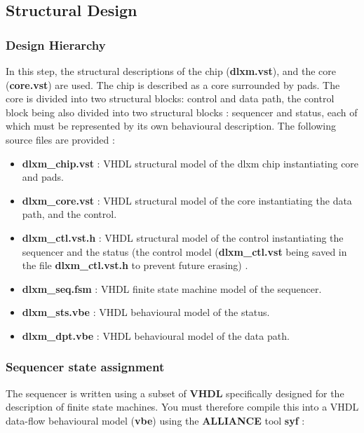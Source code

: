 

	\subsection{Structural Design}

    		\subsubsection{Design Hierarchy}


In this step, the structural descriptions of the chip ({\bf dlxm.vst}), and the core ({\bf core.vst}) are used.
The chip is described as a core surrounded by pads.
 The core is divided into two structural blocks: control and data
 path, the control block being also divided into two structural blocks
 : sequencer and status, each of which must be represented by its own behavioural description. The following source files are provided :

\begin {itemize}
\item
{\bf dlxm\_chip.vst} : VHDL structural model of the dlxm chip instantiating core and pads.
\item
{\bf dlxm\_core.vst} : VHDL structural model of the core instantiating the data path,
and the control.
\item
{\bf dlxm\_ctl.vst.h} : VHDL structural model of the control instantiating the 
sequencer and the status (the control model ({\bf dlxm\_ctl.vst} being saved in the file
{\bf dlxm\_ctl.vst.h} to prevent future erasing) .
\item {\bf dlxm\_seq.fsm} : VHDL finite state machine model of the sequencer.
\item {\bf dlxm\_sts.vbe} : VHDL behavioural model of the status.
\item {\bf dlxm\_dpt.vbe} : VHDL behavioural model of the data path.
\end{itemize}

    		\subsubsection{Sequencer state assignment}

The sequencer is written using a subset of {\bf VHDL} specifically designed for the description of finite state machines. You must therefore compile this into a VHDL data-flow behavioural model ({\bf vbe}) using the {\bf ALLIANCE} tool {\bf syf} :

